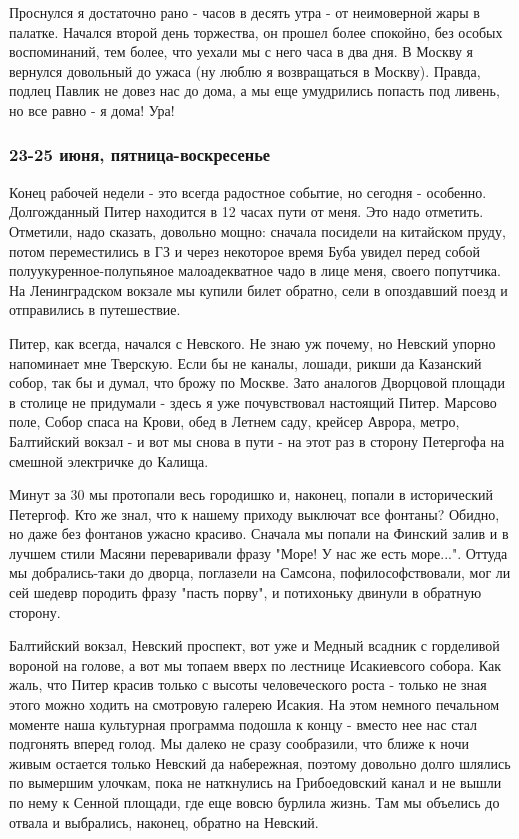 \documentclass[12pt,a4paper]{article}
\newcommand{\ssubsection}[1]{
	\subsubsection*{#1}
	\addcontentsline{toc}{subsubsection}{#1}
}
\begin{document}
Проснулся я достаточно рано - часов в десять утра - от неимоверной жары в палатке. Начался второй день торжества, он прошел более спокойно, без особых воспоминаний, тем более, что уехали мы с него часа в два дня. В Москву я вернулся довольный до ужаса (ну люблю я возвращаться в Москву). Правда, подлец Павлик не довез нас до дома, а мы еще умудрились попасть под ливень, но все равно - я дома! Ура!

\ssubsection{23-25 июня, пятница-воскресенье}
Конец рабочей недели - это всегда радостное событие, но сегодня - особенно. Долгожданный Питер находится в 12 часах пути от меня. Это надо отметить. Отметили, надо сказать, довольно мощно: сначала посидели на китайском пруду, потом переместились в ГЗ и через некоторое время Буба увидел перед собой полуукуренное-полупьяное малоадекватное чадо в лице меня, своего попутчика. На Ленинградском вокзале мы купили билет обратно, сели в опоздавший поезд и отправились в путешествие.

Питер, как всегда, начался с Невского. Не знаю уж почему, но Невский упорно напоминает мне Тверскую. Если бы не каналы, лошади, рикши да Казанский собор, так бы и думал, что брожу по Москве. Зато аналогов Дворцовой площади в столице не придумали - здесь я уже почувствовал настоящий Питер. Марсово поле, Собор спаса на Крови, обед в Летнем саду, крейсер Аврора, метро, Балтийский вокзал - и вот мы снова в пути - на этот раз в сторону Петергофа на смешной электричке до Калища.

Минут за 30 мы протопали весь городишко и, наконец, попали в исторический Петергоф. Кто же знал, что к нашему приходу выключат все фонтаны? Обидно, но даже без фонтанов ужасно красиво. Сначала мы попали на Финский залив и в лучшем стили Масяни переваривали фразу "Море! У нас же есть море...". Оттуда мы добрались-таки до дворца, поглазели на Самсона, пофилософствовали, мог ли сей шедевр породить фразу "пасть порву", и потихоньку двинули в обратную сторону.

Балтийский вокзал, Невский проспект, вот уже и Медный всадник с горделивой вороной на голове, а вот мы топаем вверх по лестнице Исакиевсого собора. Как жаль, что Питер красив только с высоты человеческого роста - только не зная этого можно ходить на смотровую галерею Исакия. На этом немного печальном моменте наша культурная программа подошла к концу - вместо нее нас стал подгонять вперед голод. Мы далеко не сразу сообразили, что ближе к ночи живым остается только Невский да набережная, поэтому довольно долго шлялись по вымершим улочкам, пока не наткнулись на Грибоедовский канал и не вышли по нему к Сенной площади, где еще вовсю бурлила жизнь. Там мы объелись до отвала и выбрались, наконец, обратно на Невский. 
\end{document}

